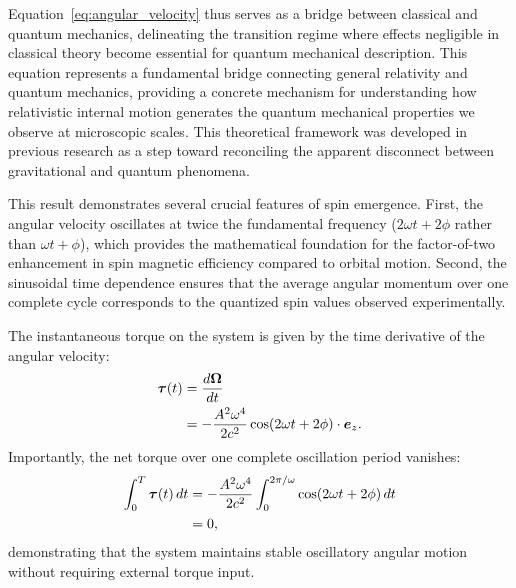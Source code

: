\documentclass[%
 reprint,
 amsmath,amssymb,
 aps,
]{revtex4-1}
\numberwithin{equation}{section}%
\begin{document}
Equation~\eqref{eq:angular_velocity} thus serves as a bridge between classical and quantum mechanics, delineating the transition regime where effects negligible in classical theory become essential for quantum mechanical description. This equation represents a fundamental bridge connecting general relativity and quantum mechanics, providing a concrete mechanism for understanding how relativistic internal motion generates the quantum mechanical properties we observe at microscopic scales. This theoretical framework was developed in previous research as a step toward reconciling the apparent disconnect between gravitational and quantum phenomena.

This result demonstrates several crucial features of spin emergence. First, the angular velocity oscillates at twice the fundamental frequency ($2\omega t + 2\phi$ rather than $\omega t + \phi$), which provides the mathematical foundation for the factor-of-two enhancement in spin magnetic efficiency compared to orbital motion. Second, the sinusoidal time dependence ensures that the average angular momentum over one complete cycle corresponds to the quantized spin values observed experimentally.

The instantaneous torque on the system is given by the time derivative of the angular velocity:
\begin{align}
\boldsymbol{\tau}(t) 
&= \frac{d\boldsymbol{\Omega}}{dt} \notag\\
&= -\frac{A^2\omega^4}{2c^2} \cos(2\omega t + 2\phi) \cdot \boldsymbol{e}_z. \label{eq:instantaneous_torque}
\end{align}
Importantly, the net torque over one complete oscillation period vanishes:
\begin{align}
\int_0^{T} \boldsymbol{\tau}(t) \, dt 
&= -\frac{A^2\omega^4}{2c^2} \int_0^{2\pi/\omega} \cos(2\omega t + 2\phi) \, dt \notag\\
&= 0, \label{eq:zero_net_torque}
\end{align}
demonstrating that the system maintains stable oscillatory angular motion without requiring external torque input.
\end{document}

